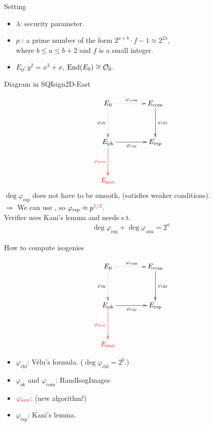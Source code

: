 \begin{frame}{Setting}
    \begin{itemize}
        \setlength{\itemsep}{10pt}
        \item $\lambda$: security parameter.
        \item $p$ : a prime number of the form $2^{a + b} \cdot f - 1 \approx 2^{2\lambda}$,\\[3pt]
                where $b \leq a \leq b + 2$ and $f$ is a small integer.
        \item $E_0 : y^2 = x^3 + x$, $\mathrm{End}(E_0) \cong \mathcal{O}_0$.
    \end{itemize}
\end{frame}

\begin{frame}{Diagram in SQIsign2D-East}

    \vspace{-10pt}
    {\large
    $$
        \xymatrix@C=40pt@R=40pt{
            E_0 \ar@{..>}[r]^{\varphi_\mathrm{com}} \ar@{..>}[d]_{\varphi_\mathrm{sk}} & E_\mathrm{com} \ar[d]^{\varphi_\mathrm{chl}} \\
            E_\mathrm{pk} \ar[r]_{\varphi_\mathrm{rsp}} \ar@[red][d]_{\red{\varphi_\mathrm{aux}}} & E_\mathrm{rsp}\\
            \red{E_\mathrm{aux}} & 
        }
    $$
    }
    $\deg\varphi_\mathrm{rsp}$ does not have to be smooth, (satisfies weaker conditions).\\[3pt]
    \quad $\Rightarrow$ We can use , so $\varphi_\mathrm{rsp} \approx p^{\textcolor{red}{1/2}}$.\\[3pt]
    \quad \hphantom{$\Rightarrow$}
    Verifier uses Kani's lemma and needs  s.t.
    \begin{align*}
        \deg\varphi_\mathrm{rsp} + \deg\varphi_\mathrm{aux} = 2^a
    \end{align*}
\end{frame}

\begin{frame}{How to compute isogenies}

    \vspace{-10pt}
    {\large
    $$
        \xymatrix@C=40pt@R=40pt{
            E_0 \ar@{..>}[r]^{\varphi_\mathrm{com}} \ar@{..>}[d]_{\varphi_\mathrm{sk}} & E_\mathrm{com} \ar[d]^{\varphi_\mathrm{chl}} \\
            E_\mathrm{pk} \ar[r]_{\varphi_\mathrm{rsp}} \ar@[red][d]_{\red{\varphi_\mathrm{aux}}} & E_\mathrm{rsp}\\
            \red{E_\mathrm{aux}} & 
        }
    $$
    }

    \begin{itemize}
        \item $\varphi_\mathrm{chl}$: V\'elu's formula. ($\deg\varphi_\mathrm{chl} = 2^b$.)
        \item $\varphi_\mathrm{sk}$ and $\varphi_\mathrm{com}$: RandIsogImages
        \item $\textcolor{red}{\varphi_\mathrm{aux}}$:  (new algorithm!)
        \item $\varphi_\mathrm{rsp}$: Kani's lemma.
    \end{itemize}
\end{frame}